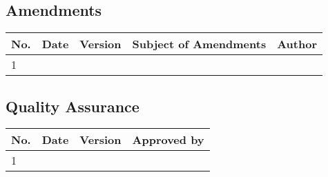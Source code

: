 \documentclass[a4paper]{arrowhead}
\begin{document}
\subsection{Amendments}

\noindent\begin{tabularx}{\textwidth}{| p{1cm} | p{2cm} | p{1.25cm} | X | p{4cm} |} \hline
\rowcolor{gray!33} No. & Date & Version & Subject of Amendments & Author \\ \hline

1 & & & & \\ \hline

\end{tabularx}

\subsection{Quality Assurance}

\noindent\begin{tabularx}{\textwidth}{| p{1cm} | p{2cm} | p{1.25cm} | X |} \hline
\rowcolor{gray!33} No. & Date & Version & Approved by \\ \hline

1 & & & \\ \hline

\end{tabularx}
\end{document}
